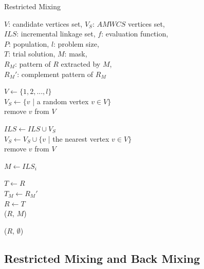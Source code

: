 \documentclass{sig-alternate-05-2015}
\begin{document}
\begin{algorithm}
\caption{Restricted Mixing}\label{algo_disjdecomp}

$V$: candidate vertices set, $V_S$: $AMWCS$ vertices set,  \\
$ILS$: incremental linkage set, $f$: evaluation function, \\
$P$: population, $l$: problem size, \\
$T$: trial solution, $M$: mask, \\
${R_M}$: pattern of $R$ extracted by $M$, \\
${R_M}'$: complement pattern of ${R_M}$


\BlankLine
$V \leftarrow \{ 1, 2, ..., l \}$ \\
$V_S \leftarrow \{v$ | a random vertex $v \in V \}$ \\
remove $v$ from $V$ \\

 {

    $ILS \leftarrow ILS \cup V_{S}$ \\
    $V_S \leftarrow V_S \cup \{v$ | the nearest vertex $v \in V \}$ \\
    remove $v$ from $V$ \\
}

\BlankLine
{} {

    $M \leftarrow ILS_i$ \\

     {

        $T \leftarrow R$ \\
        $T_M \leftarrow {R_M}'$ \\

         {
            $R \leftarrow T$ \\
            \Return ($R$, $M$)
        }
    }
}
\Return ($R$, $\emptyset$) 
\end{algorithm}


\subsection{Restricted Mixing and Back Mixing}
\end{document}
